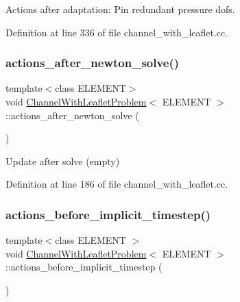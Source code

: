 Actions after adaptation\+: Pin redundant pressure dofs. 



Definition at line 336 of file channel\+\_\+with\+\_\+leaflet.\+cc.

\mbox{\label{classChannelWithLeafletProblem_a2fcba9dc98f40bbca1919a715fa087d7}} 
\subsubsection{\texorpdfstring{actions\+\_\+after\+\_\+newton\+\_\+solve()}{actions\_after\_newton\_solve()}}
{\footnotesize\ttfamily template$<$class E\+L\+E\+M\+E\+NT$>$ \\
void \hyperlink{classChannelWithLeafletProblem}{Channel\+With\+Leaflet\+Problem}$<$ E\+L\+E\+M\+E\+NT $>$\+::actions\+\_\+after\+\_\+newton\+\_\+solve (\begin{DoxyParamCaption}{ }\end{DoxyParamCaption})\hspace{0.3cm}{\ttfamily [inline]}}



Update after solve (empty) 



Definition at line 186 of file channel\+\_\+with\+\_\+leaflet.\+cc.

\mbox{\label{classChannelWithLeafletProblem_acef6ec771775162f77295a8f92d695ac}} 
\subsubsection{\texorpdfstring{actions\+\_\+before\+\_\+implicit\+\_\+timestep()}{actions\_before\_implicit\_timestep()}}
{\footnotesize\ttfamily template$<$class E\+L\+E\+M\+E\+NT $>$ \\
void \hyperlink{classChannelWithLeafletProblem}{Channel\+With\+Leaflet\+Problem}$<$ E\+L\+E\+M\+E\+NT $>$\+::actions\+\_\+before\+\_\+implicit\+\_\+timestep (\begin{DoxyParamCaption}{ }\end{DoxyParamCaption})}



